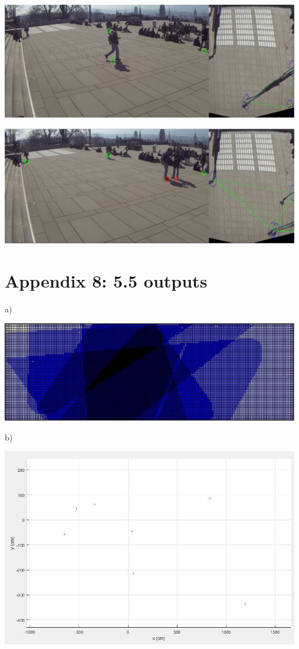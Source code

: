 \documentclass[12pt]{report}
\begin{document}
\includegraphics[width=130mm]{./images/appendix/MatrixTransExample2.JPG}

\includegraphics[width=130mm]{./images/appendix/MatrixTransExample4.JPG}

\pagebreak
\section*{Appendix 8: 5.5 outputs}

a)


\includegraphics[width=130mm]{./images/appendix/CameraOverlapIllustration.JPG}

b)


\includegraphics[width=130mm]{./images/appendix/MATLABPlot.JPG}
\end{document}
